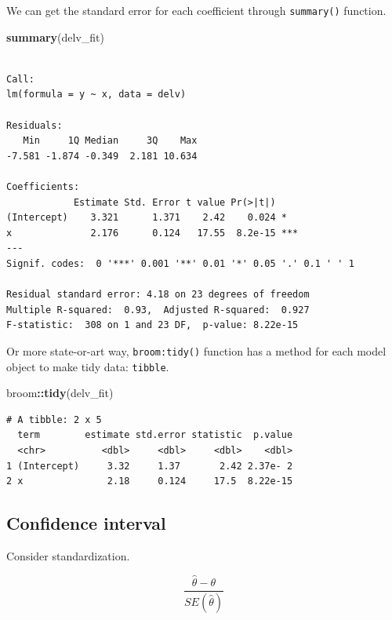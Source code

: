 \documentclass[]{book}
\newenvironment{Shaded}{\begin{snugshade}}{\end{snugshade}}
\newcommand{\KeywordTok}[1]{\textcolor[rgb]{0.13,0.29,0.53}{\textbf{#1}}}
\newcommand{\NormalTok}[1]{#1}
\newcommand{\OperatorTok}[1]{\textcolor[rgb]{0.81,0.36,0.00}{\textbf{#1}}}
\theoremstyle{definition}
\theoremstyle{definition}
\theoremstyle{definition}
\theoremstyle{remark}
\begin{document}
We can get the standard error for each coefficient through \texttt{summary()} function.

\begin{Shaded}
\begin{Highlighting}[]
\KeywordTok{summary}\NormalTok{(delv_fit)}
\end{Highlighting}
\end{Shaded}

\begin{verbatim}

Call:
lm(formula = y ~ x, data = delv)

Residuals:
   Min     1Q Median     3Q    Max 
-7.581 -1.874 -0.349  2.181 10.634 

Coefficients:
            Estimate Std. Error t value Pr(>|t|)    
(Intercept)    3.321      1.371    2.42    0.024 *  
x              2.176      0.124   17.55  8.2e-15 ***
---
Signif. codes:  0 '***' 0.001 '**' 0.01 '*' 0.05 '.' 0.1 ' ' 1

Residual standard error: 4.18 on 23 degrees of freedom
Multiple R-squared:  0.93,  Adjusted R-squared:  0.927 
F-statistic:  308 on 1 and 23 DF,  p-value: 8.22e-15
\end{verbatim}

Or more state-or-art way, \texttt{broom:tidy()} function has a method for each model object to make tidy data: \texttt{tibble}.

\begin{Shaded}
\begin{Highlighting}[]
\NormalTok{broom}\OperatorTok{::}\KeywordTok{tidy}\NormalTok{(delv_fit)}
\end{Highlighting}
\end{Shaded}

\begin{verbatim}
# A tibble: 2 x 5
  term        estimate std.error statistic  p.value
  <chr>          <dbl>     <dbl>     <dbl>    <dbl>
1 (Intercept)     3.32     1.37       2.42 2.37e- 2
2 x               2.18     0.124     17.5  8.22e-15
\end{verbatim}

\hypertarget{confidence-interval}{%
\subsection{Confidence interval}\label{confidence-interval}}

Consider standardization.

\[\frac{\hat\theta - \theta}{SE(\hat\theta)}\]
\end{document}
